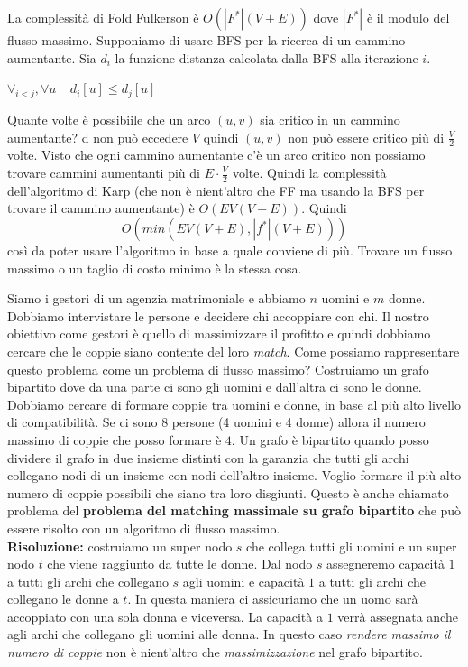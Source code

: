 \documentclass[a4paper]{article}
\begin{document}
\noindent
La complessità di Fold Fulkerson è $O(|F^\ast|(V+E))$ dove $|F^\ast|$ è il modulo del flusso massimo. 
Supponiamo di usare BFS per la ricerca di un cammino aumentante. Sia $d_i$ la funzione distanza calcolata dalla BFS alla iterazione $i$. 
\begin{lemma}
  $\forall_{i < j}, \forall u \; \; \; \;  d_i[u] \le d_j[u]$ 
\end{lemma}
Quante volte è possibiile che un arco $(u,v)$ sia critico in un cammino aumentante?
d non può eccedere $V$ quindi $(u,v)$ non può essere critico più di $\frac{V}{2}$ volte. 
Visto che ogni cammino aumentante c'è un arco critico non possiamo trovare cammini aumentanti più di $E \cdot \frac{V}{2}$ volte.
Quindi la complessità dell'algoritmo di Karp (che non è nient'altro che FF ma usando la BFS per trovare il cammino aumentante) è $O(EV(V+E))$.
Quindi \[O(min(EV(V+E), |f^\ast|(V+E)))\]
così da poter usare l'algoritmo in base a quale conviene di più.
Trovare un flusso massimo o un taglio di costo minimo è la stessa cosa. 

\ex{}
{
  Siamo i gestori di un agenzia matrimoniale e abbiamo $n$ uomini e $m$ donne. Dobbiamo intervistare le persone e decidere chi accoppiare con chi. 
  Il nostro obiettivo come gestori è quello di massimizzare il profitto e quindi dobbiamo cercare che le coppie siano contente del loro \textit{match}.
  Come possiamo rappresentare questo problema come un problema di flusso massimo?
  Costruiamo un grafo bipartito dove da una parte ci sono gli uomini e dall'altra ci sono le donne. 
  Dobbiamo cercare di formare coppie tra uomini e donne, in base al più alto livello di compatibilità. Se ci sono 8 persone (4 uomini e 4 donne) allora
  il numero massimo di coppie che posso formare è $4$. 
  Un grafo è bipartito quando posso dividere il grafo in due insieme distinti con la garanzia che tutti gli archi collegano nodi di un insieme con nodi dell'altro insieme.
  Voglio formare il più alto numero di coppie possibili che siano tra loro disgiunti.  Questo è anche chiamato problema del \textbf{problema del matching massimale su grafo bipartito} 
  che può essere risolto con un algoritmo di flusso massimo.
  \\
  \textbf{Risoluzione: }
  costruiamo un super nodo $s$ che collega tutti gli uomini e un super nodo $t$ che viene raggiunto da tutte le donne.
  Dal nodo $s$ assegneremo capacità $1$ a tutti gli archi che collegano $s$ agli uomini e capacità $1$ a tutti gli archi che collegano le donne a $t$.
  In questa maniera ci assicuriamo che un uomo sarà accoppiato con una sola donna e viceversa.
  La capacità a $1$ verrà assegnata anche agli archi che collegano gli uomini alle donna. 
  In questo caso \textit{rendere massimo il numero di coppie} non è nient'altro che \textit{massimizzazione} nel grafo bipartito.
} 
\end{document}
